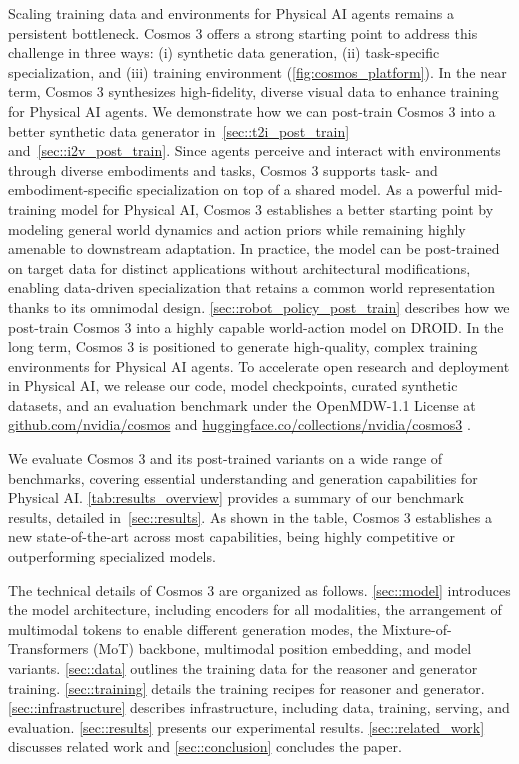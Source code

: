 

Scaling training data and environments for Physical AI agents remains a persistent bottleneck. Cosmos 3 offers a strong starting point to address this challenge in three ways: (i) synthetic data generation, (ii) task-specific specialization, and (iii) training environment (\cref{fig:cosmos_platform}).
In the near term, Cosmos 3 synthesizes high-fidelity, diverse visual data to enhance training for Physical AI agents. We demonstrate how we can post-train Cosmos 3 into a better synthetic data generator in~\cref{sec::t2i_post_train} and~\cref{sec::i2v_post_train}.
Since agents perceive and interact with environments through diverse embodiments and tasks, Cosmos 3 supports task- and embodiment-specific specialization on top of a shared model. As a powerful mid-training model for Physical AI, Cosmos 3 establishes a better starting point by modeling general world dynamics and action priors while remaining highly amenable to downstream adaptation. In practice, the model can be post-trained on target data for distinct applications without architectural modifications, enabling data-driven specialization that retains a common world representation thanks to its omnimodal design.
\cref{sec::robot_policy_post_train} describes how we post-train Cosmos 3 into a highly capable world-action model on DROID.
In the long term, Cosmos 3 is positioned to generate high-quality, complex training environments for Physical AI agents. To accelerate open research and deployment in Physical AI, we release our code, model checkpoints, curated synthetic datasets, and an evaluation benchmark under the OpenMDW-1.1 License at \href{https://github.com/nvidia/cosmos}{github.com/nvidia/cosmos} and \href{https://huggingface.co/collections/nvidia/cosmos3}{huggingface.co/collections/nvidia/cosmos3} .





We evaluate Cosmos 3 and its post-trained variants on a wide range of benchmarks, covering essential understanding and generation capabilities for Physical AI. \cref{tab:results_overview} provides a summary of our benchmark results, detailed in~\cref{sec::results}. As shown in the table, Cosmos 3 establishes a new state-of-the-art across most capabilities, being highly competitive or outperforming specialized models. 


The technical details of Cosmos 3 are organized as follows.
\cref{sec::model} introduces the model architecture, including encoders for all modalities, the arrangement of multimodal tokens to enable different generation modes, the Mixture-of-Transformers (MoT) backbone, multimodal position embedding, and model variants.
\cref{sec::data} outlines the training data for the reasoner and generator training.
\cref{sec::training} details the training recipes for reasoner and generator.
\cref{sec::infrastructure} describes infrastructure, including data, training, serving, and evaluation.
\cref{sec::results} presents our experimental results.
\cref{sec::related_work} discusses related work and \cref{sec::conclusion} concludes the paper.
